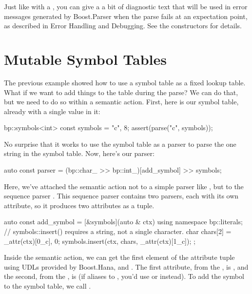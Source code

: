 \documentclass{MyBook}
\begin{document}
Just like with a , you can give a  a bit of diagnostic text that will be used in error messages generated by Boost.Parser when the parse fails at an expectation point, as described in Error Handling and Debugging. See the  constructors for details.

\section{Mutable Symbol Tables}

The previous example showed how to use a symbol table as a fixed lookup table. What if we want to add things to the table during the parse? We can do that, but we need to do so within a semantic action. First, here is our symbol table, already with a single value in it:

\begin{code}
bp::symbols<int> const symbols = {{"c", 8}};
assert(parse("c", symbols));
\end{code}

No surprise that it works to use the symbol table as a parser to parse the one string in the symbol table. Now, here's our parser:

\begin{code}
auto const parser = (bp::char_ >> bp::int_)[add_symbol] >> symbols;
\end{code}

Here, we've attached the semantic action not to a simple parser like , but to the sequence parser . This sequence parser contains two parsers, each with its own attribute, so it produces two attributes as a tuple.

\begin{code}
auto const add_symbol = [&symbols](auto & ctx) {
    using namespace bp::literals;
    // symbols::insert() requires a string, not a single character.
    char chars[2] = {_attr(ctx)[0_c], 0};
    symbols.insert(ctx, chars, _attr(ctx)[1_c]);
};
\end{code}

Inside the semantic action, we can get the first element of the attribute tuple using UDLs provided by Boost.Hana, and . The first attribute, from the , is , and the second, from the , is  (if  aliases to , you'd use  or  instead). To add the symbol to the symbol table, we call .
\end{document}
